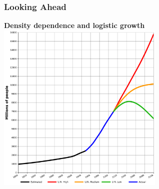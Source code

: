 \documentclass[color=usenames,dvipsnames]{beamer}\usepackage[]{graphicx}\usepackage[]{color}
\begin{document}
















\begin{frame}
  \frametitle{Looking Ahead}
  \begin{center}
    {\large \bf Density dependence and logistic growth}
    \includegraphics[width=0.6\textwidth]{figs/UN-population}
  \end{center}
\end{frame}
\end{document}
